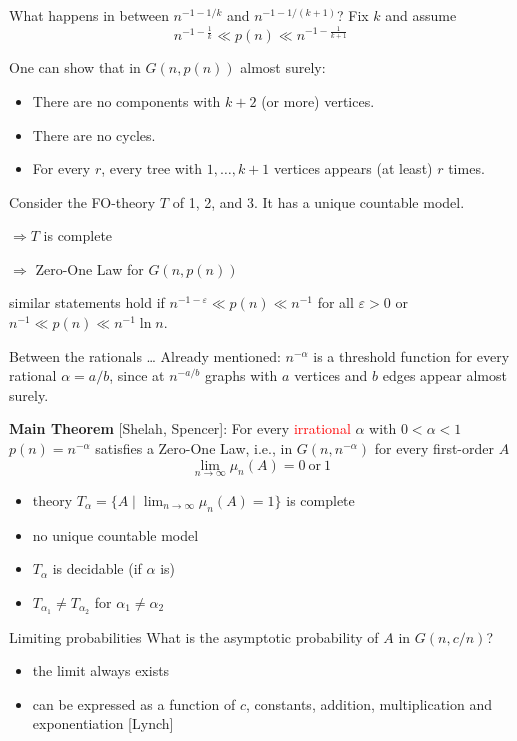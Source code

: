 \documentclass[handout]{beamer}
\renewcommand{\emph}[1]{\textcolor{red}{#1}}
\begin{document}
\begin{frame}{What happens in between $n^{-1-1/k}$ and $n^{-1-1/(k+1)}$?}
	Fix $k$ and assume
	$$n^{-1-\frac{1}{k}} \ll p(n) \ll n^{-1-\frac{1}{k+1}}$$

	One can show that in $G(n,p(n))$ almost surely: 
	\begin{itemize}
		\item There are no components with $k+2$ (or more) vertices.
		\item There are no cycles.
		\item For every $r$, every tree with  $1,\ldots,k+1$ vertices appears (at least) $r$ times.
	\end{itemize}

	\pause
	Consider the FO-theory $T$ of 1, 2, and 3. It has a unique countable model.

	$\Rightarrow T$ is complete 

	$\Rightarrow$ Zero-One Law for $G(n,p(n))$ 

	\bigskip
	\pause
	similar statements hold if $n^{-1-\varepsilon}\ll p(n) \ll n^{-1}$ for all $\varepsilon>0$
	or $n^{-1}\ll p(n) \ll n^{-1}\ln n$. 
\end{frame}

\begin{frame}{Between the rationals \dots}
	Already mentioned: $n^{-\alpha}$ is a threshold function for every rational $\alpha=a/b$,
	since at $n^{-a/b}$ graphs with $a$ vertices and $b$ edges appear almost surely.
	
	\pause
	\bigskip
	\textbf{Main Theorem} [Shelah, Spencer]: For every \emph{irrational} $\alpha$ with $0<\alpha<1$
	$p(n)=n^{-\alpha}$ satisfies a Zero-One Law, \mbox{i.e.}, in $G(n,n^{-\alpha})$ for every first-order $A$
	$$\lim_{n\rightarrow\infty}\mu_n(A)=0\mathrm{\ or\ } 1$$

	\pause
	\begin{itemize}
		\item theory $T_{\alpha}=\{A\mid \lim_{n\rightarrow\infty}\mu_n(A)=1\}$ is complete
		\item no unique countable model
		\item $T_{\alpha}$ is decidable (if $\alpha$ is)
		\item $T_{\alpha_1}\neq T_{\alpha_2}$ for $\alpha_1\neq\alpha_2$
	\end{itemize}
\end{frame}


\begin{frame}{Limiting probabilities}
	What is the asymptotic probability of $A$ in $G(n,c/n)$?
	\pause

	\begin{itemize}
		\item the limit always exists
		\item can be expressed as a function of $c$, constants, addition, multiplication and exponentiation [Lynch]
	\end{itemize}
\end{frame}



\begin{frame}{}
\end{frame}
\end{document}
